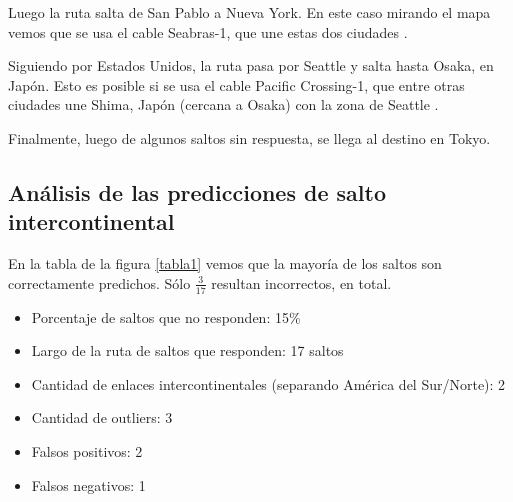 Luego la ruta salta de San Pablo a Nueva York. En este caso mirando el mapa \cite{cables} vemos que se usa el cable Seabras-1, que une estas dos ciudades \cite{seabras1}.

Siguiendo por Estados Unidos, la ruta pasa por Seattle y salta hasta Osaka, en Japón. Esto es posible si se usa el cable Pacific Crossing-1, que entre otras ciudades une Shima, Japón (cercana a Osaka) con la zona de Seattle \cite{pc1}.

Finalmente, luego de algunos saltos sin respuesta, se llega al destino en Tokyo.

\subsection{Análisis de las predicciones de salto intercontinental}

En la tabla de la figura \ref{tabla1} vemos que la mayoría de los saltos son correctamente predichos. Sólo $\frac{3}{17}$ resultan incorrectos, en total.

\begin{itemize}
	\item Porcentaje de saltos que no responden: 15\%
	\item Largo de la ruta de saltos que responden: 17 saltos 
	\item Cantidad de enlaces intercontinentales (separando América del Sur/Norte): 2
	\item Cantidad de outliers: 3
	\item Falsos positivos: 2
	\item Falsos negativos: 1
\end{itemize}

